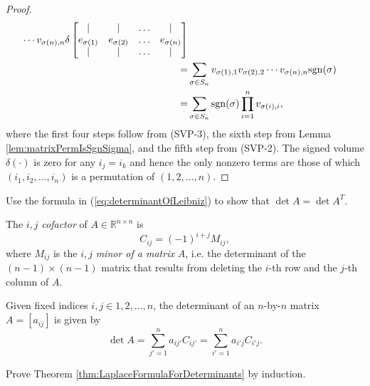 \begin{proof}
\begin{align*}
       \cdots v_{\sigma(n),n}
    \delta
    \begin{bmatrix}
      | & | & \ldots & |
      \\
      e_{\sigma(1)} & e_{\sigma(2)} & \ldots & e_{\sigma(n)}
      \\
      | & | & \ldots & |
    \end{bmatrix}
    \\
    =& \sum_{\sigma\in S_n} v_{\sigma(1),1}v_{\sigma(2),2}
       \cdots v_{\sigma(n),n}
       \mathrm{sgn}(\sigma)
    \\
    =& \sum_{\sigma\in S_n} \mathrm{sgn}(\sigma)
       \prod_{i=1}^nv_{\sigma(i),i}, 
  \end{align*}
  where the first four steps follow from (SVP-3),
  the sixth step from Lemma \ref{lem:matrixPermIsSgnSigma},
  and the fifth step from \mbox{(SVP-2)}.
  The signed volume $\delta(\cdot)$ is zero for any $i_j=i_k$
   and hence the only nonzero terms are those
   of which $(i_1, i_2, \ldots, i_n)$
   is a permutation of $(1,2,\ldots,n)$.
\end{proof}

\begin{exc}
  Use the formula in (\ref{eq:determinantOfLeibniz})
   to show that $\det A = \det A^T$.
\end{exc}

\begin{defn}
  \label{def:cofactor}
  The $i, j$ \emph{cofactor} of $A\in \mathbb{R}^{n\times n}$
   is 
   \begin{equation}
     \label{eq:cofactor}
     C_{ij} = (-1)^{i+j} M_{ij},
   \end{equation}
   where $M_{ij}$ is the $i, j$ \emph{minor of a matrix} $A$,
   i.e. the determinant of the $(n-1)\times(n-1)$ matrix
   that results from deleting the $i$-th row and the $j$-th column of $A$.
\end{defn}

\begin{thm}
  \label{thm:LaplaceFormulaForDeterminants}
  Given fixed indices $i, j \in {1, 2, \ldots, n}$,
  the determinant of an $n$-by-$n$ matrix $A = [a_{ij}]$
   is given by
   \begin{equation}
     \label{eq:LaplaceFormulaForDeterminants}
     \det A = \sum_{j'=1}^n a_{ij'} C_{ij'} = \sum_{i'=1}^n a_{i'j} C_{i'j}.
   \end{equation}
\end{thm}

\begin{exc}
  Prove Theorem \ref{thm:LaplaceFormulaForDeterminants}
  by induction.
\end{exc}





